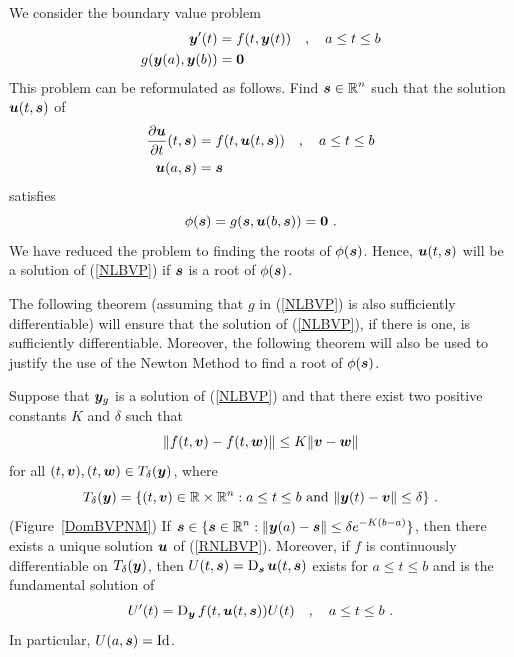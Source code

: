 We consider the boundary value problem
\begin{equation} \label{NLBVP}
\begin{split}
\bm{y}'(t) &= f(t,\bm{y}(t)) \quad , \quad a \leq t \leq b \\
g(\bm{y}(a), \bm{y}(b)) &= \bm{0}
\end{split}
\end{equation}
This problem can be reformulated as follows.  Find
$\displaystyle \bm{s} \in \mathbb{R}^n$
such that the solution $\bm{u}(t,\bm{s})$ of
\begin{equation} \label{RNLBVP}
\begin{split}
\frac{\partial{\bm{u}}}{\partial{t}}(t,\bm{s}) &= f(t, \bm{u}(t,\bm{s})) \quad , \quad
a \leq t \leq b \\
\bm{u}(a,\bm{s})&= \bm{s}
\end{split}
\end{equation}
satisfies
\begin{equation} \label{Iter}
\phi(\bm{s}) = g(\bm{s},\bm{u}(b,\bm{s})) = \bm{0} \ .
\end{equation}
We have reduced the problem to finding the roots of
$\phi(\bm{s})$.  Hence, $\bm{u}(t,\bm{s})$ will be a solution
of (\ref{NLBVP}) if $\bm{s}$ is a root of $\phi(\bm{s})$.

The following theorem (assuming that $g$ in (\ref{NLBVP}) is also
sufficiently differentiable) will ensure that the solution of
(\ref{NLBVP}), if there is one, is sufficiently differentiable.
Moreover, the following theorem will also be used to justify
the use of the Newton Method to find a root of $\phi(\bm{s})$.

\begin{theorem}
Suppose that $\bm{y}_g$ is a solution of (\ref{NLBVP}) and that there
exist two positive constants $K$ and $\delta$ such that
\[
\| f(t,\bm{v}) - f(t,\bm{w}) \| \leq
K \| \bm{v} - \bm{w} \|
\]
for all $(t,\bm{v}),(t,\bm{w}) \in T_\delta(\bm{y})$, where
\[
T_\delta(\bm{y}) = \{ (t,\bm{v}) \in \mathbb{R}\times \mathbb{R}^n : a \leq t \leq b
\text{ and } \| \bm{y}(t) - \bm{v} \| \leq \delta \} \ .
\]
(Figure~\ref{DomBVPNM})
If $\displaystyle \bm{s} \in \{ \bm{s}\in\mathbb{R}^n : \| \bm{y}(a) - \bm{s}\|
\leq \delta e^{-K(b-a)} \}$, then there exists a unique solution
$\bm{u}$ of (\ref{RNLBVP}).  Moreover, if
$f$ is continuously differentiable on $T_\delta(\bm{y})$, then
$\displaystyle U(t,\bm{s}) = \operatorname{D}_{\bm{s}} \bm{u}(t,\bm{s})$
exists for $a \leq t \leq b$ and is the fundamental solution of
\begin{equation} \label{EforFS}
U'(t) = \operatorname{D}_{\bm{y}} f(t,\bm{u}(t,\bm{s})) U(t) \quad , \quad
a \leq t \leq b \ .
\end{equation}
In particular, $U(a,\bm{s}) = \operatorname{Id}$.
\label{smoothSol}
\end{theorem}


